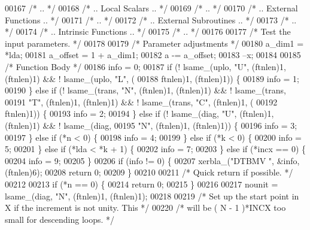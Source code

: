 \begin{DoxyCode}
00167 \textcolor{comment}{/*     .. */}
00168 \textcolor{comment}{/*     .. Local Scalars .. */}
00169 \textcolor{comment}{/*     .. */}
00170 \textcolor{comment}{/*     .. External Functions .. */}
00171 \textcolor{comment}{/*     .. */}
00172 \textcolor{comment}{/*     .. External Subroutines .. */}
00173 \textcolor{comment}{/*     .. */}
00174 \textcolor{comment}{/*     .. Intrinsic Functions .. */}
00175 \textcolor{comment}{/*     .. */}
00176 
00177 \textcolor{comment}{/*     Test the input parameters. */}
00178 
00179     \textcolor{comment}{/* Parameter adjustments */}
00180     a\_dim1 = *lda;
00181     a\_offset = 1 + a\_dim1;
00182     a -= a\_offset;
00183     --x;
00184 
00185     \textcolor{comment}{/* Function Body */}
00186     info = 0;
00187     \textcolor{keywordflow}{if} (! lsame\_(uplo, \textcolor{stringliteral}{"U"}, (ftnlen)1, (ftnlen)1) && ! lsame\_(uplo, \textcolor{stringliteral}{"L"}, (
00188         ftnlen)1, (ftnlen)1)) \{
00189     info = 1;
00190     \} \textcolor{keywordflow}{else} \textcolor{keywordflow}{if} (! lsame\_(trans, \textcolor{stringliteral}{"N"}, (ftnlen)1, (ftnlen)1) && ! lsame\_(trans, 
00191         \textcolor{stringliteral}{"T"}, (ftnlen)1, (ftnlen)1) && ! lsame\_(trans, \textcolor{stringliteral}{"C"}, (ftnlen)1, (
00192         ftnlen)1)) \{
00193     info = 2;
00194     \} \textcolor{keywordflow}{else} \textcolor{keywordflow}{if} (! lsame\_(diag, \textcolor{stringliteral}{"U"}, (ftnlen)1, (ftnlen)1) && ! lsame\_(diag, 
00195         \textcolor{stringliteral}{"N"}, (ftnlen)1, (ftnlen)1)) \{
00196     info = 3;
00197     \} \textcolor{keywordflow}{else} \textcolor{keywordflow}{if} (*n < 0) \{
00198     info = 4;
00199     \} \textcolor{keywordflow}{else} \textcolor{keywordflow}{if} (*k < 0) \{
00200     info = 5;
00201     \} \textcolor{keywordflow}{else} \textcolor{keywordflow}{if} (*lda < *k + 1) \{
00202     info = 7;
00203     \} \textcolor{keywordflow}{else} \textcolor{keywordflow}{if} (*incx == 0) \{
00204     info = 9;
00205     \}
00206     \textcolor{keywordflow}{if} (info != 0) \{
00207     xerbla\_(\textcolor{stringliteral}{"DTBMV "}, &info, (ftnlen)6);
00208     \textcolor{keywordflow}{return} 0;
00209     \}
00210 
00211 \textcolor{comment}{/*     Quick return if possible. */}
00212 
00213     \textcolor{keywordflow}{if} (*n == 0) \{
00214     \textcolor{keywordflow}{return} 0;
00215     \}
00216 
00217     nounit = lsame\_(diag, \textcolor{stringliteral}{"N"}, (ftnlen)1, (ftnlen)1);
00218 
00219 \textcolor{comment}{/*     Set up the start point in X if the increment is not unity. This */}
00220 \textcolor{comment}{/*     will be  ( N - 1 )*INCX   too small for descending loops. */}

\end{DoxyCode}
